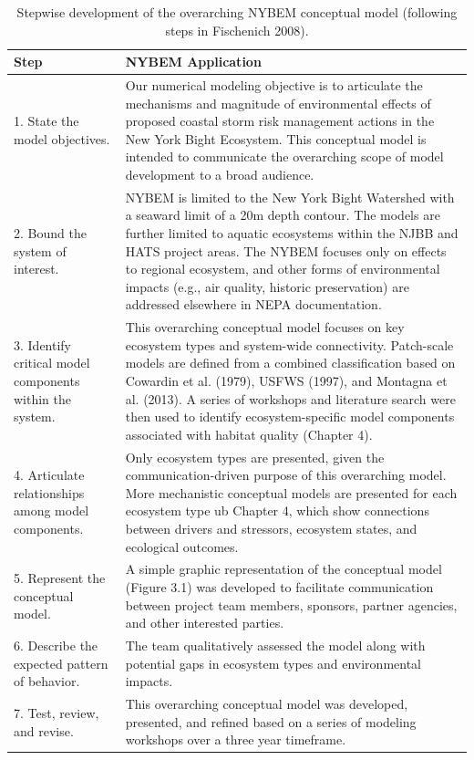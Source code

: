 \documentclass[
]{book}
\begin{document}
\begin{table}

\caption{\label{tab:unnamed-chunk-3}Stepwise development of the overarching NYBEM conceptual model (following steps in Fischenich 2008).}
\centering
\begin{tabular}[t]{l|l}
\hline
Step & NYBEM Application\\
\hline
1. State the model objectives. & Our numerical modeling objective is to articulate the mechanisms and magnitude of environmental effects of proposed coastal storm risk management actions in the New York Bight Ecosystem. This conceptual model is intended to communicate the overarching scope of model development to a broad audience.\\
\hline
2. Bound the system of interest. & NYBEM is limited to the New York Bight Watershed with a seaward limit of a 20m depth contour. The models are further limited to aquatic ecosystems within the NJBB and HATS project areas. The NYBEM focuses only on effects to regional ecosystem, and other forms of environmental impacts (e.g., air quality, historic preservation) are addressed elsewhere in NEPA documentation.\\
\hline
3. Identify critical model components within the system. & This overarching conceptual model focuses on key ecosystem types and system-wide connectivity. Patch-scale models are defined from a combined classification based on Cowardin et al. (1979), USFWS (1997), and Montagna et al. (2013). A series of workshops and literature search were then used to identify ecosystem-specific model components associated with habitat quality (Chapter 4).\\
\hline
4. Articulate relationships among model components. & Only ecosystem types are presented, given the communication-driven purpose of this overarching model. More mechanistic conceptual models are presented for each ecosystem type ub Chapter 4, which show connections between drivers and stressors, ecosystem states, and ecological outcomes.\\
\hline
5. Represent the conceptual model. & A simple graphic representation of the conceptual model (Figure 3.1) was developed to facilitate communication between project team members, sponsors, partner agencies, and other interested parties.\\
\hline
6. Describe the expected pattern of behavior. & The team qualitatively assessed the model along with potential gaps in ecosystem types and environmental impacts.\\
\hline
7. Test, review, and revise. & This overarching conceptual model was developed, presented, and refined based on a series of modeling workshops over a three year timeframe.\\
\hline
\end{tabular}
\end{table}
\end{document}
